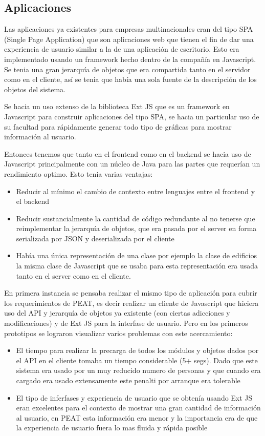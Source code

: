 \documentclass{article}
\begin{document}
\subsection{Aplicaciones}
Las aplicaciones ya existentes para empresas multinacionales eran del tipo
SPA (Single Page Application) que son aplicaciones web que tienen el fin
de dar una experiencia de usuario similar a la de una aplicación de escritorio.
Esto era implementado usando un framework hecho dentro de la compañía
en Javascript. Se tenia una gran jerarquía de objetos que era
compartida tanto en el servidor como en el cliente, así se tenia que
había una sola fuente de la descripción de los objetos del sistema.

Se hacia un uso extenso de la biblioteca Ext JS que es un framework
en Javascript para construir aplicaciones del tipo SPA, se hacia un particular
uso de su facultad para rápidamente generar todo tipo de gráficas para mostrar
información al usuario.

Entonces tenemos que tanto en el frontend como en el backend se hacia
uso de Javascript principalmente con un núcleo de Java para las partes
que requerían un rendimiento optimo. Esto tenia varias ventajas:

\begin{itemize}
\item Reducir al mínimo el cambio de contexto entre lenguajes entre
  el frontend y el backend
\item Reducir sustancialmente la cantidad de código redundante al no
  tenerse que reimplementar la jerarquía de objetos, que era pasada
  por el server en forma serializada por JSON y deserializada por el
  cliente
\item Había una única representación de una clase por ejemplo la
  clase de edificios la misma clase de Javascript que se usaba para
  esta representación era usada tanto en el server como en el
  cliente.
\end{itemize}

En primera instancia se pensaba realizar el mismo tipo de aplicación
para cubrir los requerimientos de PEAT, es decir realizar un cliente
de Javascript que hiciera uso del API y jerarquía de objetos ya
existente (con ciertas adicciones y modificaciones) y de Ext JS
para la interfase de usuario. Pero en los primeros prototipos se
lograron visualizar varios problemas con este acercamiento:

\begin{itemize}
\item El tiempo para realizar la precarga de todos los módulos y
  objetos dados por el API en el cliente tomaba un tiempo
  considerable (5+ segs). Dado que este sistema era usado por un muy
  reducido numero de personas y que cuando era cargado era usado
  extensamente este penalti por arranque era tolerable
\item El tipo de inferfases y experiencia de usuario que se obtenía
  usando Ext JS eran excelentes para el contexto de mostrar una gran
  cantidad de información al usuario, en PEAT esta información era menor
  y la importancia era de que la experiencia de usuario fuera lo mas fluida y
  rápida posible
\end{itemize}
\end{document}
